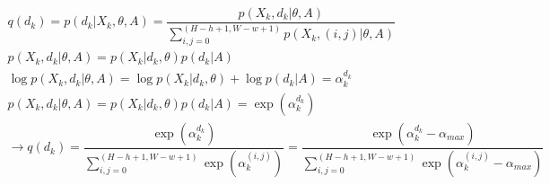 \begin{gather*}
	q(d_k) = p(d_k | X_k, \theta, A) = \dfrac{p(X_k, d_k | \theta, A)}{\sum_{i, j = 0}^{(H-h+1, W-w+1)} p(X_k, (i, j) | \theta, A)} \\
	p(X_k, d_k | \theta, A) = p(X_k | d_k, \theta) p(d_k| A) \\
	\log p(X_k, d_k | \theta, A) = \log p(X_k | d_k, \theta) + \log p(d_k| A) = \alpha_{k}^{d_k}\\
	p(X_k, d_k | \theta, A) = p(X_k | d_k, \theta) p(d_k| A) = \exp(\alpha_{k}^{d_k})\\
	\rightarrow q(d_k) = \dfrac{\exp(\alpha_{k}^{d_k})}{\sum_{i, j = 0}^{(H-h+1, W-w+1)} \exp(\alpha_{k}^{(i, j)})} = \dfrac{\exp(\alpha_{k}^{d_k} - \alpha_{max})}{\sum_{i, j = 0}^{(H-h+1, W-w+1)} \exp(\alpha_{k}^{(i, j)} - \alpha_{max})}
\end{gather*}